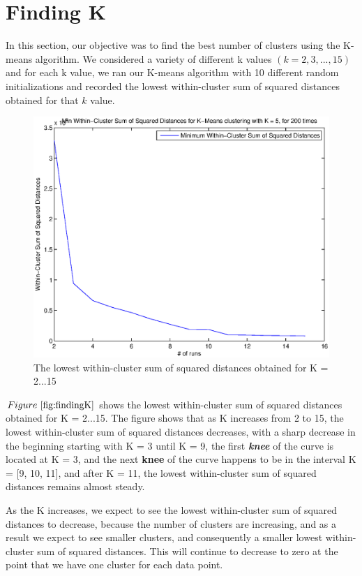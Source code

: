 \documentclass{article} %
\begin{document}
\section{Finding K }
In this section, our objective was to find the best number of clusters using the K-means algorithm. We considered a variety of different k values $\left(k = 2, 3, ..., 15\right)$ and for each k value, we ran our K-means algorithm with 10 different random initializations and recorded the lowest within-cluster sum of squared distances obtained for that $k$ value. 

\begin{figure}[h]
\begin{center}
\includegraphics[width=13cm]{Fig/fig_findingK.eps}
 \end{center}
\caption{\small{The lowest within-cluster sum of squared distances obtained for K = 2...15}} 
\label{fig:findingK}
\end{figure}

$Figure~\ref{fig:findingK}$ shows the lowest within-cluster sum of squared distances obtained for K = 2...15. The figure shows that as K increases from 2 to 15, the lowest within-cluster sum of squared distances decreases, with a sharp decrease in the beginning starting with K = 3 until K = 9, the first \textit{\textbf{knee}} of the curve is located at K = 3, and the next \textbf{knee} of the curve happens to be in the interval K = [9, 10, 11], and after K = 11, the lowest within-cluster sum of squared distances remains almost steady. 

As the K increases, we expect to see the lowest within-cluster sum of squared distances to decrease, because the number of clusters are increasing, and as a result we expect to see smaller clusters, and consequently a smaller lowest within-cluster sum of squared distances. This will continue to decrease to zero at the point that we have one cluster for each data point. 
\end{document}
